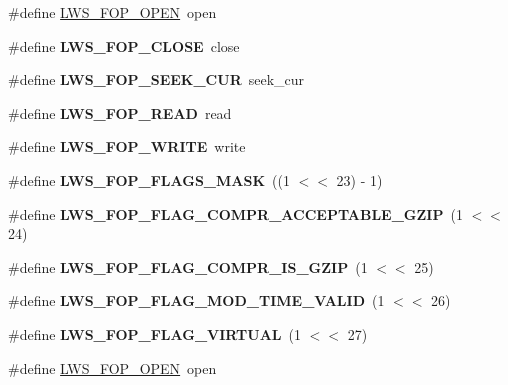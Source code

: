 \begin{DoxyCompactItemize}
\#define \hyperlink{group__fops_ga7972d4b546c7af37bb76d4c60f2ad553}{L\+W\+S\+\_\+\+F\+O\+P\+\_\+\+O\+P\+EN}~open
\item 
\mbox{\label{group__fops_ga993a0264dac738d32e40bfd802877596}} 
\#define {\bfseries L\+W\+S\+\_\+\+F\+O\+P\+\_\+\+C\+L\+O\+SE}~close
\item 
\mbox{\label{group__fops_ga372b5af81a2927c4a0d8f8ac04e22ea9}} 
\#define {\bfseries L\+W\+S\+\_\+\+F\+O\+P\+\_\+\+S\+E\+E\+K\+\_\+\+C\+UR}~seek\+\_\+cur
\item 
\mbox{\label{group__fops_gab0daaa4c50c0689f5ecddbc93b258052}} 
\#define {\bfseries L\+W\+S\+\_\+\+F\+O\+P\+\_\+\+R\+E\+AD}~read
\item 
\mbox{\label{group__fops_ga8ed9a52c15cb4efa6024a3632fb7a571}} 
\#define {\bfseries L\+W\+S\+\_\+\+F\+O\+P\+\_\+\+W\+R\+I\+TE}~write
\item 
\mbox{\label{group__fops_ga4515771d224d2dbaa6409e1958b81faf}} 
\#define {\bfseries L\+W\+S\+\_\+\+F\+O\+P\+\_\+\+F\+L\+A\+G\+S\+\_\+\+M\+A\+SK}~((1 $<$$<$ 23) -\/ 1)
\item 
\mbox{\label{group__fops_ga95a53aaaba125ce154e455d76d5b2c22}} 
\#define {\bfseries L\+W\+S\+\_\+\+F\+O\+P\+\_\+\+F\+L\+A\+G\+\_\+\+C\+O\+M\+P\+R\+\_\+\+A\+C\+C\+E\+P\+T\+A\+B\+L\+E\+\_\+\+G\+Z\+IP}~(1 $<$$<$ 24)
\item 
\mbox{\label{group__fops_ga5c896c010b90ab0fb6ff9ab96133e4b2}} 
\#define {\bfseries L\+W\+S\+\_\+\+F\+O\+P\+\_\+\+F\+L\+A\+G\+\_\+\+C\+O\+M\+P\+R\+\_\+\+I\+S\+\_\+\+G\+Z\+IP}~(1 $<$$<$ 25)
\item 
\mbox{\label{group__fops_ga2046444d8c9c559a5b4a2e78740e89fc}} 
\#define {\bfseries L\+W\+S\+\_\+\+F\+O\+P\+\_\+\+F\+L\+A\+G\+\_\+\+M\+O\+D\+\_\+\+T\+I\+M\+E\+\_\+\+V\+A\+L\+ID}~(1 $<$$<$ 26)
\item 
\mbox{\label{group__fops_ga9705d2349b62f175fadc4a3f72e38c33}} 
\#define {\bfseries L\+W\+S\+\_\+\+F\+O\+P\+\_\+\+F\+L\+A\+G\+\_\+\+V\+I\+R\+T\+U\+AL}~(1 $<$$<$ 27)
\item 
\#define \hyperlink{group__fops_ga7972d4b546c7af37bb76d4c60f2ad553}{L\+W\+S\+\_\+\+F\+O\+P\+\_\+\+O\+P\+EN}~open
$$
\end{DoxyCompactItemize}
